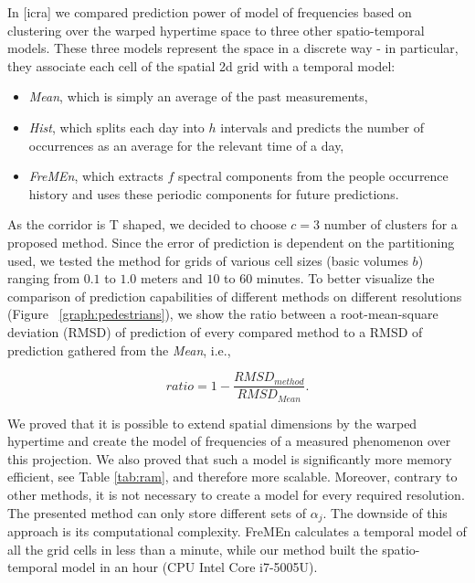 In [icra] we compared prediction power of model of frequencies based on clustering over the warped hypertime space 
to three other spatio-temporal models. 
These three models represent the space in a discrete way - in particular, they associate each cell of the spatial 2d grid with a temporal model: 
\begin{itemize}
    \item \textit{Mean}, which is simply an average of the past measurements, 
    \item \textit{Hist}, which splits each day into $h$ intervals and predicts the number of occurrences as an average for the relevant time of a day, 
    \item \textit{FreMEn}, which extracts $f$ spectral components from the people occurrence history and uses these periodic components for future predictions.
\end{itemize}
As the corridor is T shaped, we decided to choose $c = 3$ number of clusters for a proposed method. 
Since the error of prediction is dependent on the partitioning used, we tested the method for grids of various cell sizes (basic volumes $b$) ranging from $0.1$ to $1.0$ meters and $10$ to $60$ minutes.
To better visualize the comparison of prediction capabilities of different methods on different resolutions (Figure ~\ref{graph:pedestrians}), we show the ratio between a root-mean-square deviation \cite{hyndman2006another} (RMSD) of prediction of every compared method to a RMSD of prediction gathered from the \textit{Mean}, i.e.,

\begin{equation}\label{eq:ratio}
ratio = 1 - \frac{RMSD_{method}}{RMSD_{Mean}}.
\end{equation}



We proved that it is possible to extend spatial dimensions by the warped hypertime and create the model of frequencies of a measured phenomenon over this projection.
We also proved that such a model is significantly more memory efficient, see Table \ref{tab:ram},  and therefore more scalable.
Moreover, contrary to other methods, it is not necessary to create a model for every required resolution.
The presented method can only store different sets of $\alpha_{j}$.  
The downside of this approach is its computational complexity.
FreMEn calculates a temporal model of all the grid cells in less than a minute, while our method built the spatio-temporal model in an hour (CPU Intel Core i7-5005U).



